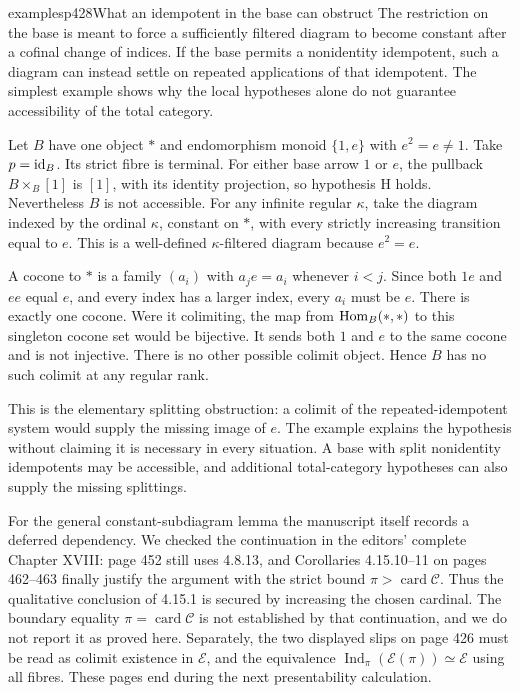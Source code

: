 \begin{dcomment}{examples}{p428}{What an idempotent in the base can obstruct}
The restriction on the base is meant to force a sufficiently filtered diagram to become constant after a cofinal change of indices. If the base permits a nonidentity idempotent, such a diagram can instead settle on repeated applications of that idempotent. The simplest example shows why the local hypotheses alone do not guarantee accessibility of the total category.

Let $B$ have one object $*$ and endomorphism monoid $\{1,e\}$ with $e^2=e\ne1$. Take $p=\mathrm{id}_B$. Its strict fibre is terminal. For either base arrow $1$ or $e$, the pullback $B\times_B[1]$ is $[1]$, with its identity projection, so hypothesis H holds. Nevertheless $B$ is not accessible. For any infinite regular $\kappa$, take the diagram indexed by the ordinal $\kappa$, constant on $*$, with every strictly increasing transition equal to $e$. This is a well-defined $\kappa$-filtered diagram because $e^2=e$.

A cocone to $*$ is a family $(a_i)$ with $a_j e=a_i$ whenever $i<j$. Since both $1e$ and $ee$ equal $e$, and every index has a larger index, every $a_i$ must be $e$. There is exactly one cocone. Were it colimiting, the map from $\operatorname{Hom}_B(*,*)$ to this singleton cocone set would be bijective. It sends both $1$ and $e$ to the same cocone and is not injective. There is no other possible colimit object. Hence $B$ has no such colimit at any regular rank.

This is the elementary splitting obstruction: a colimit of the repeated-idempotent system would supply the missing image of $e$. The example explains the hypothesis without claiming it is necessary in every situation. A base with split nonidentity idempotents may be accessible, and additional total-category hypotheses can also supply the missing splittings.

For the general constant-subdiagram lemma the manuscript itself records a deferred dependency. We checked the continuation in the editors' complete Chapter XVIII: page 452 still uses 4.8.13, and Corollaries 4.15.10--11 on pages 462--463 finally justify the argument with the strict bound $\pi>\operatorname{card}\mathcal C$. Thus the qualitative conclusion of 4.15.1 is secured by increasing the chosen cardinal. The boundary equality $\pi=\operatorname{card}\mathcal C$ is not established by that continuation, and we do not report it as proved here. Separately, the two displayed slips on page 426 must be read as colimit existence in $\mathcal E$, and the equivalence $\operatorname{Ind}_\pi(\mathcal E(\pi))\simeq\mathcal E$ using all fibres. These pages end during the next presentability calculation.
\end{dcomment}


